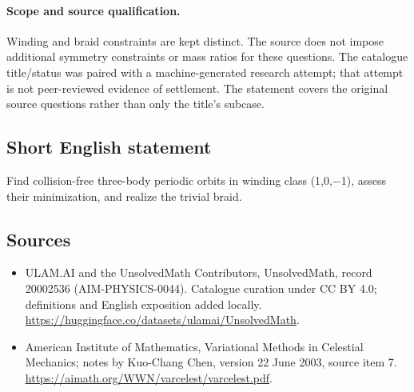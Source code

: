 \documentclass[11pt]{article}
\begin{document}
\paragraph{Scope and source qualification.}Winding and braid constraints are kept distinct. The source does not impose additional symmetry constraints or mass ratios for these questions. The catalogue title/status was paired with a machine-generated research attempt; that attempt is not peer-reviewed evidence of settlement. The statement covers the original source questions rather than only the title’s subcase.
\subsection{Short English statement}
Find collision-free three-body periodic orbits in winding class (1,0,−1), assess their minimization, and realize the trivial braid.
\subsection{Sources}
\begin{itemize}
\item[\hypertarget{source:20002536:1}{S1}] ULAM.AI and the UnsolvedMath Contributors, UnsolvedMath, record 20002536 (AIM-PHYSICS-0044). Catalogue curation under CC BY 4.0; definitions and English exposition added locally.
\url{https://huggingface.co/datasets/ulamai/UnsolvedMath}.
\item[\hypertarget{source:20002536:2}{S2}] American Institute of Mathematics, Variational Methods in Celestial Mechanics; notes by Kuo-Chang Chen, version 22 June 2003, source item 7.
\url{https://aimath.org/WWN/varcelest/varcelest.pdf}.
\end{itemize}
\label{end:20002536}
\end{document}

